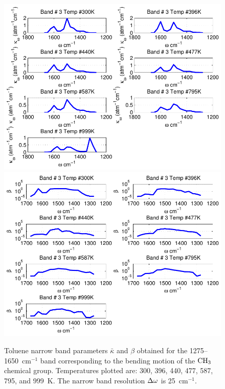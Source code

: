 \begin{figure}[p]
\begin{center}
\includegraphics[width=5.0in]{Figures/Toluene_Kappa_Band3_MALKMUS.pdf}
\includegraphics[width=5.0in]{Figures/Toluene_Beta_Band3_MALKMUS.pdf}
\end{center}
\caption{Toluene narrow band parameters $\bar{\kappa}$ and $\beta$ obtained for the 1275--1650~cm$^{-1}$ band corresponding to the bending motion of the $\rm CH_3$ chemical group. Temperatures plotted are: 300, 396, 440, 477, 587, 795, and 999~K. The narrow band resolution $\Delta \omega$ is 25~cm$^{-1}$.\label{fig:toluene_kappa_beta3}}
\end{figure}

